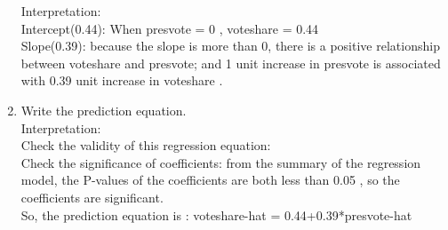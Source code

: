 \documentclass[12pt,letterpaper]{article}
\begin{document}
\begin{enumerate}
		\noindent
		Interpretation:\\
		Intercept(0.44): When presvote = 0 , voteshare = 0.44\\
		Slope(0.39): because the slope is more than 0, there is a positive relationship between voteshare and presvote; and 1 unit increase in presvote is associated with 0.39 unit increase in voteshare .\\
		\item Write the prediction equation.\\
		\noindent
		Interpretation:\\
		Check the validity of this regression equation:\\
		Check the significance of coefficients: from the summary of the regression model, the P-values of the coefficients are both less than 0.05 , so the coefficients are significant.\\
		So, the prediction equation is : voteshare-hat = 0.44+0.39*presvote-hat
	\end{enumerate}
	

\newpage	
\end{document}
